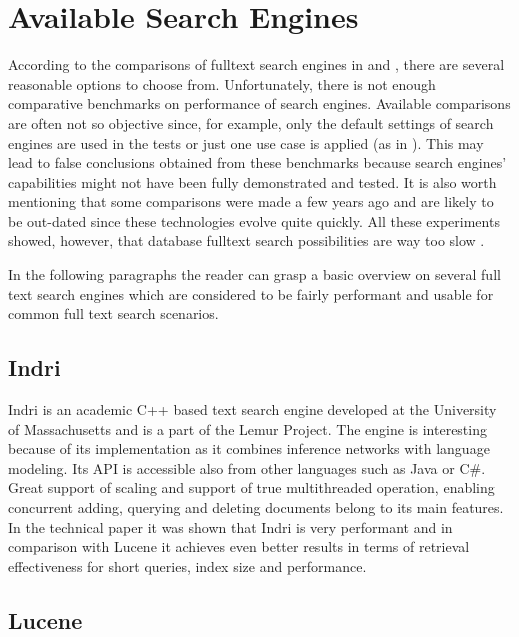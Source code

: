 \chapter{Available Search Engines}

According to the comparisons of fulltext search engines in \cite{MiddletonBaeza} and \cite{SinghSearchEngines}, there are several reasonable options to choose from. 
Unfortunately, there is not enough comparative benchmarks on performance of search engines. Available comparisons are often not so objective since, for example, only the default settings of search engines are used in the tests or just one use case is applied
(as in \cite{SinghSearchEngines}). 
This may lead to false conclusions obtained from these benchmarks because search engines' capabilities might not have been fully demonstrated and tested. 
It is also worth mentioning that some comparisons were made a few years ago and are likely to be out-dated since these technologies evolve quite quickly.
All these experiments showed, however, that database fulltext search possibilities are way too slow \cite{BenchmarkLuceneRelDB,BenchmarkMysqlLuceneSphinx}.

In the following paragraphs the reader can grasp a basic overview on several full text search engines which are considered to be fairly
performant and usable for common full text search scenarios.

\section{Indri}

Indri \cite{IndriHome} is an academic C++ based text search engine
developed at the University of Massachusetts and is a part of the
Lemur Project. The engine is interesting because of its implementation
as it combines inference networks with language modeling. Its API
is accessible also from other languages such as Java or C\#. Great
support of scaling and support of true multithreaded operation, enabling
concurrent adding, querying and deleting documents belong to its main
features. In the technical paper \cite{ComparisonLuceneIndri}
it was shown that Indri is very performant and in comparison with
Lucene it achieves even better results in terms of retrieval effectiveness
for short queries, index size and performance.


\section{Lucene}

